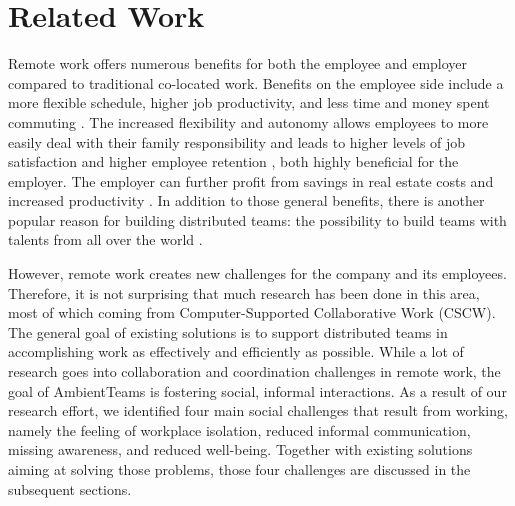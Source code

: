 \chapter{Related Work}
\label{chapter:related_work}
Remote work offers numerous benefits for both the employee and employer compared to traditional co-located work. Benefits on the employee side include a more flexible schedule, higher job productivity, and less time and money spent commuting \autocite{flores2019understanding, mulki2009set}. The increased flexibility and autonomy allows employees to more easily deal with their family responsibility and leads to higher levels of job satisfaction and higher employee retention \autocite{mulki2009set, gajendran2007good, madsen2011benefits}, both highly beneficial for the employer. The employer can further profit from savings in real estate costs and increased productivity \autocite{mulki2009set}. In addition to those general benefits, there is another popular reason for building distributed teams: the possibility to build teams with talents from all over the world \autocite{carmel1999global}.

However, remote work creates new challenges for the company and its employees. Therefore, it is not surprising that much research has been done in this area, most of which coming from Computer-Supported Collaborative Work (CSCW). The general goal of existing solutions is to support distributed teams in accomplishing work as effectively and efficiently as possible. While a lot of research goes into collaboration and coordination challenges in remote work, the goal of AmbientTeams is fostering social, informal interactions. As a result of our research effort, we identified four main social challenges that result from working, namely the feeling of workplace isolation, reduced informal communication, missing awareness, and reduced well-being. Together with existing solutions aiming at solving those problems, those four challenges are discussed in the subsequent sections.



